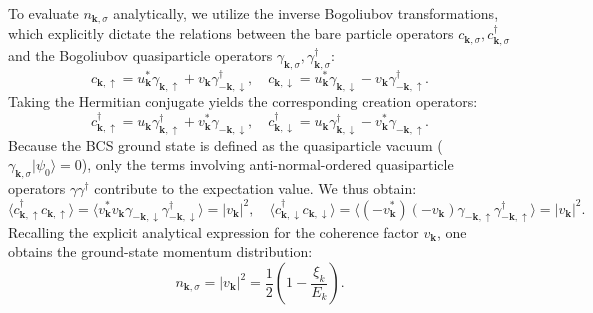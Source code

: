 To evaluate \( n_{\mathbf{k},\sigma} \) analytically, we utilize the inverse Bogoliubov transformations, which explicitly dictate the relations between the bare particle operators \( c_{\mathbf{k},\sigma}, c_{\mathbf{k},\sigma}^\dagger \) and the Bogoliubov quasiparticle operators \( \gamma_{\mathbf{k},\sigma}, \gamma_{\mathbf{k},\sigma}^\dagger \):
\[
    c_{\mathbf{k},\uparrow} = u_{\mathbf{k}}^* \gamma_{\mathbf{k},\uparrow} + v_{\mathbf{k}} \gamma_{-\mathbf{k},\downarrow}^\dagger, \quad c_{\mathbf{k},\downarrow} = u_{\mathbf{k}}^* \gamma_{\mathbf{k},\downarrow} - v_{\mathbf{k}} \gamma_{-\mathbf{k},\uparrow}^\dagger.
\]
Taking the Hermitian conjugate yields the corresponding creation operators:
\[
    c_{\mathbf{k},\uparrow}^\dagger = u_{\mathbf{k}} \gamma_{\mathbf{k},\uparrow}^\dagger + v_{\mathbf{k}}^* \gamma_{-\mathbf{k},\downarrow}, \quad c_{\mathbf{k},\downarrow}^\dagger = u_{\mathbf{k}} \gamma_{\mathbf{k},\downarrow}^\dagger - v_{\mathbf{k}}^* \gamma_{-\mathbf{k},\uparrow}.
\]
Because the BCS ground state is defined as the quasiparticle vacuum (\( \gamma_{\mathbf{k},\sigma} |\psi_0\rangle = 0 \)), only the terms involving anti-normal-ordered quasiparticle operators \( \gamma \gamma^\dagger \) contribute to the expectation value. We thus obtain:
\[
    \langle c_{\mathbf{k},\uparrow}^\dagger c_{\mathbf{k},\uparrow} \rangle = \langle v_{\mathbf{k}}^* v_{\mathbf{k}} \gamma_{-\mathbf{k},\downarrow} \gamma_{-\mathbf{k},\downarrow}^\dagger \rangle = |v_{\mathbf{k}}|^2, \quad \langle c_{\mathbf{k},\downarrow}^\dagger c_{\mathbf{k},\downarrow} \rangle = \langle (-v_{\mathbf{k}}^*)(-v_{\mathbf{k}}) \gamma_{-\mathbf{k},\uparrow} \gamma_{-\mathbf{k},\uparrow}^\dagger \rangle = |v_{\mathbf{k}}|^2.
\]
Recalling the explicit analytical expression for the coherence factor \( v_{\mathbf{k}} \), one obtains the ground-state momentum distribution:
\begin{equation} \label{eq:momentum_distribution}
    n_{\mathbf{k},\sigma} = |v_{\mathbf{k}}|^2 = \frac{1}{2} \left( 1 - \frac{\xi_k}{E_k} \right).
\end{equation}


